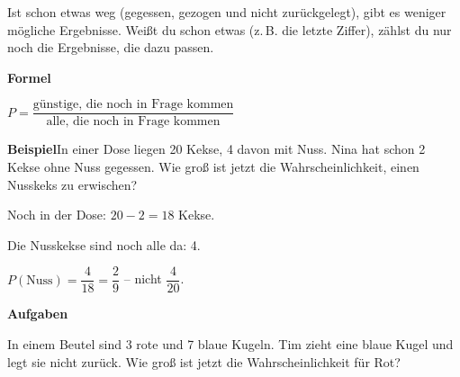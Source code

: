 \documentclass[11pt]{article}
\newcommand{\aufg}[3]{\par\noindent\makebox[0pt][r]{#3}\begin{minipage}[t]{\linewidth}#1\end{minipage}\par}
\newcommand{\nr}[1]{\makebox[7mm][l]{\textbf{#1}}}
\newlength{\kr}
\begin{document}
\ifdim\kr>12mm\noindent{\scriptsize\color{mbgrau}Platz zum Rechnen}\par\nointerlineskip\vspace{1mm}\noindent
\begin{tikzpicture}\clip (0,0) rectangle ({\linewidth-0.5mm},\kr);\draw[black!16,line width=0.3pt,step=5mm] (0,0) grid (\linewidth,\kr);\end{tikzpicture}\fi\par
\clearpage\label{s:D}\noindent\colorbox{black!12}{}\hspace{3mm}{\Large\bfseries Wenn sich die Grundmenge ändert}\par\smallskip
\noindent Ist schon etwas weg (gegessen, gezogen und nicht zurückgelegt), gibt es weniger mögliche Ergebnisse. Weißt du schon etwas (z.\,B. die letzte Ziffer), zählst du nur noch die Ergebnisse, die dazu passen.\par\medskip
\noindent\textbf{Formel}\par\nopagebreak\noindent\hspace*{4mm}\begin{minipage}{\dimexpr\linewidth-4mm\relax}$P = \dfrac{\text{günstige, die noch in Frage kommen}}{\text{alle, die noch in Frage kommen}}$\end{minipage}\par\medskip
\noindent\textbf{Beispiel}\quad In einer Dose liegen 20 Kekse, 4 davon mit Nuss. Nina hat schon 2 Kekse ohne Nuss gegessen. Wie groß ist jetzt die Wahrscheinlichkeit, einen Nusskeks zu erwischen?\par\smallskip
\noindent\par\noindent{}Noch in der Dose: $20 - 2 = 18$ Kekse.\par\smallskip\par\noindent{}Die Nusskekse sind noch alle da: 4.\par\smallskip\par\noindent{}$P(\text{Nuss}) = \dfrac{4}{18} = \dfrac{2}{9}$ – nicht $\dfrac{4}{20}$.\par\smallskip\par\medskip
\noindent\textbf{Aufgaben}\par\smallskip
\aufg{\nr{1.}In einem Beutel sind 3 rote und 7 blaue Kugeln. Tim zieht eine blaue Kugel und legt sie nicht zurück. Wie groß ist jetzt die Wahrscheinlichkeit für Rot?}{}{}
\end{document}
